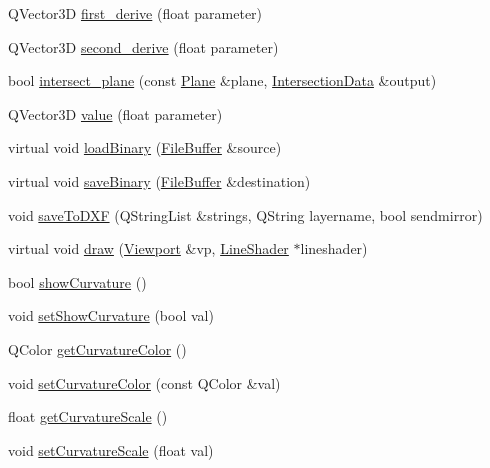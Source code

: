 \begin{DoxyCompactItemize}
\item 
Q\-Vector3\-D \hyperlink{classShipCAD_1_1Spline_afe15664ac97d1d3452d5a5cfd023c471}{first\-\_\-derive} (float parameter)
\item 
Q\-Vector3\-D \hyperlink{classShipCAD_1_1Spline_abe04c117432e350f3a9f66395d2d3037}{second\-\_\-derive} (float parameter)
\item 
bool \hyperlink{classShipCAD_1_1Spline_afd932e0c63a3b03200ecdc7c656be8e4}{intersect\-\_\-plane} (const \hyperlink{classShipCAD_1_1Plane}{Plane} \&plane, \hyperlink{classShipCAD_1_1IntersectionData}{Intersection\-Data} \&output)
\item 
Q\-Vector3\-D \hyperlink{classShipCAD_1_1Spline_a589d6d945e0fbb905ea94907cd216165}{value} (float parameter)
\item 
virtual void \hyperlink{classShipCAD_1_1Spline_ae90c8807fb8058d6309f47db64e2d40e}{load\-Binary} (\hyperlink{classShipCAD_1_1FileBuffer}{File\-Buffer} \&source)
\item 
virtual void \hyperlink{classShipCAD_1_1Spline_abaf1c6eebdfe8abd41287c1fcb38a808}{save\-Binary} (\hyperlink{classShipCAD_1_1FileBuffer}{File\-Buffer} \&destination)
\item 
void \hyperlink{classShipCAD_1_1Spline_a03ddf553749e09aa03a38ff5ce0e0b31}{save\-To\-D\-X\-F} (Q\-String\-List \&strings, Q\-String layername, bool sendmirror)
\item 
virtual void \hyperlink{classShipCAD_1_1Spline_a6424ed433d241f566c15891cc25a74dd}{draw} (\hyperlink{classShipCAD_1_1Viewport}{Viewport} \&vp, \hyperlink{classShipCAD_1_1LineShader}{Line\-Shader} $\ast$lineshader)
\item 
bool \hyperlink{classShipCAD_1_1Spline_a2c232b5ca5da62ba07ec9aa8ede3fd17}{show\-Curvature} ()
\item 
void \hyperlink{classShipCAD_1_1Spline_aae0f5ce3bc2aa58759abd32f3462bf16}{set\-Show\-Curvature} (bool val)
\item 
Q\-Color \hyperlink{classShipCAD_1_1Spline_ae2e47ccb73a45e0f0d2df2484ba509ae}{get\-Curvature\-Color} ()
\item 
void \hyperlink{classShipCAD_1_1Spline_ac40c22712433f98d657ecaed459d03a0}{set\-Curvature\-Color} (const Q\-Color \&val)
\item 
float \hyperlink{classShipCAD_1_1Spline_ade326d9cd43b6523516b1113b0bddd1b}{get\-Curvature\-Scale} ()
\item 
void \hyperlink{classShipCAD_1_1Spline_a17ba0378bfd4a39b4d96d914332c26e4}{set\-Curvature\-Scale} (float val)
\item 

\end{DoxyCompactItemize}
